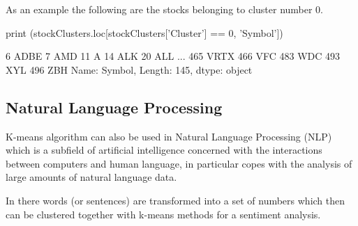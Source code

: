 As an example the following are the stocks belonging to cluster number 0.

\begin{ipythonnon} 
print (stockClusters.loc[stockClusters['Cluster'] == 0, 'Symbol'])
\end{ipythonnon}
\begin{ioutput}
6      ADBE
7       AMD
11        A
14      ALK
20      ALL
       ... 
465    VRTX
466     VFC
483     WDC
493     XYL
496     ZBH
Name: Symbol, Length: 145, dtype: object
\end{ioutput}

\subsection{Natural Language Processing}

K-means algorithm can also be used in Natural Language Processing (NLP)~\cite{bib:nlp} which is a subfield of artificial intelligence concerned with the interactions between computers and human language, in particular copes with the analysis of large amounts of natural language data.

In there words (or sentences) are transformed into a set of numbers which then can be clustered together with k-means methods for a sentiment analysis.

